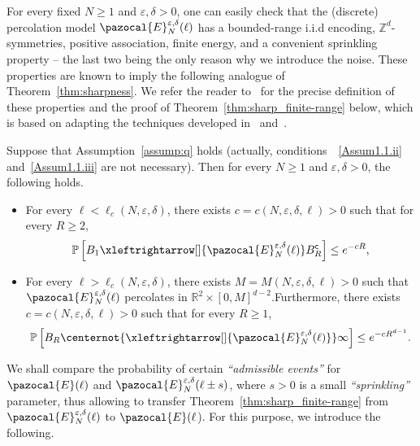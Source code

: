 \documentclass[AHL,Unicode,longabstracts,published]{cedram}
\renewcommand{\P}{\mathbb{P}}
\newcommand{\R}{\mathbb{R}}
\newcommand{\Z}{\mathbb{Z}}
\newcommand{\sfc}{\mathsf{c}}
\newcommand{\lr}[4]{#3\xleftrightarrow[#1]{#2} #4}
\newcommand{\nlr}[4]{#3\centernot{\xleftrightarrow[#1]{#2}} #4}
\newcommand{\R}{\mathbb{R}}
\newcommand{\Z}{\mathbb{Z}}
\begin{document}
For every fixed $N\geq1$ and $\varepsilon,\delta>0$, one can easily check that the (discrete) percolation model $\pazocal{E}_{N}^{\varepsilon,\delta}(\ell)$ has a bounded-range i.i.d encoding, $\Z^d$-symmetries, positive association, finite energy, and a convenient sprinkling property -- the last two being the only reason why we introduce the noise. These properties are known to imply the following analogue of Theorem~\ref{thm:sharpness}. We refer the reader to~\cite[Section~6]{DGRS19} for the precise definition of these properties and the proof of Theorem~\ref{thm:sharp_finite-range} below, which is based on adapting the techniques developed in~\cite{DumRaoTas17b} and~\cite{GriMar90}.

\begin{theo}\label{thm:sharp_finite-range}
Suppose that Assumption~\ref{assump:q} holds (actually, conditions~~\eqref{Assum1.1.ii} and~\eqref{Assum1.1.iii} are not necessary).
Then for every $N\geq1$ and $\varepsilon,\delta>0$, the following holds.
\begin{itemize}
\item For every $\ell<\ell_c(N,\varepsilon,\delta)$, there exists $c=c(N,\varepsilon,\delta,\ell)>0$ such that for every $R\geq2$,
\begin{equation}\label{eq:exp_decay_truncated}
\P\left[\lr{}{\pazocal{E}_N^{\varepsilon,\delta}(\ell)}{B_1}{B_R^{\sfc}}\right]\leq e^{-cR},
\end{equation}
\item For every $\ell>\ell_c(N,\varepsilon,\delta)$, there exists $M=M(N,\varepsilon,\delta,\ell)>0$ such that $\pazocal{E}_N^{\varepsilon,\delta}(\ell)$ percolates in $\R^2\times[0,M]^{d-2}$.Furthermore, there exists $c=c(N,\varepsilon,\delta,\ell)>0$ such that for every $R\geq1$,
\begin{equation}\label{eq:exp_decay2_truncated}
\P\left[\nlr{}{\pazocal{E}_N^{\varepsilon,\delta}(\ell)}{B_R}{\infty}\right]\leq e^{-cR^{d-1}}.
\end{equation}
\end{itemize}
\end{theo}

We shall compare the probability of certain \emph{``admissible events''} for $\pazocal{E}(\ell)$ and $\pazocal{E}_N^{\varepsilon,\delta}(\ell\pm s)$, where $s>0$ is a small \emph{``sprinkling''} parameter, thus allowing to transfer Theorem~\ref{thm:sharp_finite-range} from $\pazocal{E}_{N}^{\varepsilon,\delta}(\ell)$ to $\pazocal{E}(\ell$). For this purpose, we introduce the following.
\end{document}
